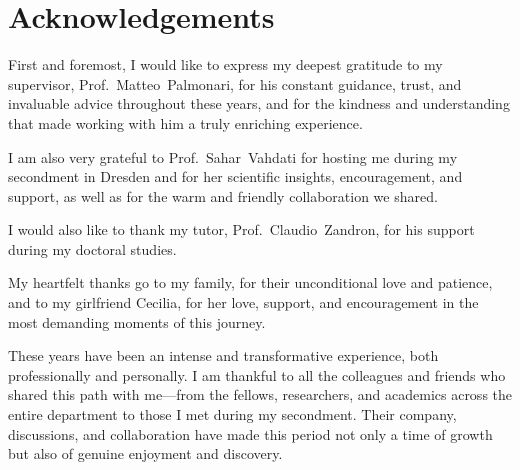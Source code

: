 \chapter*{Acknowledgements}

First and foremost, I would like to express my deepest gratitude to my supervisor, Prof.~Matteo~Palmonari, for his constant guidance, trust, and invaluable advice throughout these years, and for the kindness and understanding that made working with him a truly enriching experience.

\medskip\noindent
I am also very grateful to Prof.~Sahar~Vahdati for hosting me during my secondment in Dresden and for her scientific insights, encouragement, and support, as well as for the warm and friendly collaboration we shared.

\medskip\noindent
I would also like to thank my tutor, Prof.~Claudio~Zandron, for his support during my doctoral studies.

\medskip\noindent
My heartfelt thanks go to my family, for their unconditional love and patience, and to my girlfriend Cecilia, for her love, support, and encouragement in the most demanding moments of this journey.

\medskip\noindent
These years have been an intense and transformative experience, both professionally and personally. I am thankful to all the colleagues and friends who shared this path with me---from the \phd fellows, researchers, and academics across the entire department to those I met during my secondment. Their company, discussions, and collaboration have made this period not only a time of growth but also of genuine enjoyment and discovery.

